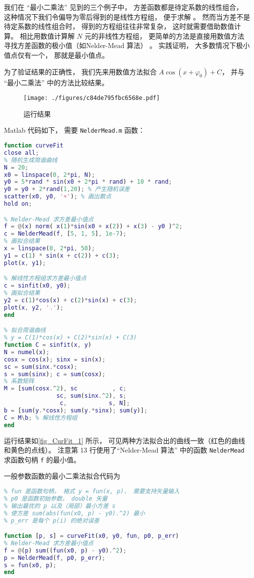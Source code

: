
我们在 “最小二乘法” 见到的三个例子中， 方差函数都是待定系数的线性组合， 这种情况下我们令偏导为零后得到的是线性方程组， 便于求解 %
。 然而当方差不是待定系数的线性组合时， 得到的方程组往往非常复杂， 这时就需要借助数值计算。 相比用数值计算解 $N$ 元的非线性方程组， 更简单的方法是直接用数值方法寻找方差函数的极小值（如Nelder-Mead 算法） 。 实践证明， 大多数情况下极小值点仅有一个， 那就是最小值点。

为了验证结果的正确性， 我们先来用数值方法拟合 $A\cos (x + \varphi_0) + C$， 并与 “最小二乘法” 中的方法比较结果。

\begin{figure}[ht]
\centering
\texttt{[image: ./figures/c84de795fbc6568e.pdf]}
\caption{运行结果} \label{fig_CurFit_1}
\end{figure}

Matlab 代码如下， 需要 \verb|NelderMead.m| 函数：
\begin{lstlisting}[language=matlab, caption=curveFit\_test.m]
function curveFit
close all;
% 随机生成简谐曲线
N = 20;
x0 = linspace(0, 2*pi, N);
y0 = 5*rand * sin(x0 + 2*pi * rand) + 10 * rand;
y0 = y0 + 2*rand(1,20); % 产生随机误差
scatter(x0, y0, '+'); % 画出散点
hold on;

% Nelder-Mead 求方差最小值点
f = @(x) norm( x(1)*sin(x0 + x(2)) + x(3) - y0 )^2;
c = NelderMead(f, [5, 1, 5], 1e-7);
% 画拟合结果
x = linspace(0, 2*pi, 50);
y1 = c(1) * sin(x + c(2)) + c(3);
plot(x, y1);

% 解线性方程组求方差最小值点
c = sinfit(x0, y0);
% 画拟合结果
y2 = c(1)*cos(x) + c(2)*sin(x) + c(3);
plot(x, y2, '.');
end

% 拟合简谐曲线
% y = C(1)*cos(x) + C(2)*sin(x) + C(3)
function C = sinfit(x, y)
N = numel(x);
cosx = cos(x); sinx = sin(x);
sc = sum(sinx.*cosx);
s = sum(sinx); c = sum(cosx);
% 系数矩阵
M = [sum(cosx.^2), sc          , c;
               sc, sum(sinx.^2), s;
                c,            s, N];
b = [sum(y.*cosx); sum(y.*sinx); sum(y)];
C = M\b; % 解线性方程组
end
\end{lstlisting}

运行结果如\autoref{fig_CurFit_1} 所示， 可见两种方法拟合出的曲线一致（红色的曲线和黄色的点线）。 注意第 13 行使用了“Nelder-Mead 算法” 中的函数 \verb|NelderMead| 求函数句柄 \verb|f| 的最小值。

一般参数函数的最小二乘法拟合代码为
\begin{lstlisting}[language=matlab, caption=curveFit.m]
% 最小二乘法拟合一元实函数，(x0,y0) 是数据点
% fun 是函数句柄， 格式 y = fun(x, p)， 需要支持矢量输入
% p0 是函数初始参数， double 矢量
% 输出最优的 p 以及（局部）最小方差 s
% 使方差 sum(abs(fun(x0, p) - y0).^2) 最小
% p_err 是每个 p(i) 的绝对误差

function [p, s] = curveFit(x0, y0, fun, p0, p_err)
% Nelder-Mead 求方差最小值点
f = @(p) sum((fun(x0, p) - y0).^2);
p = NelderMead(f, p0, p_err);
s = fun(x0, p);
end
\end{lstlisting}
